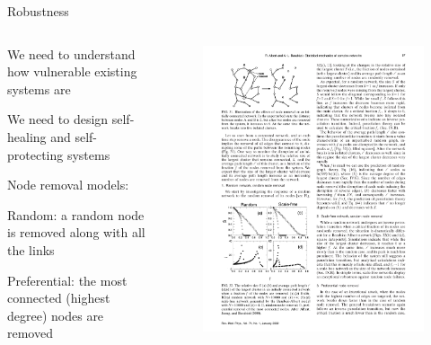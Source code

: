 \begin{frame}{Robustness}

\begin{columns}
\begin{column}{0.5\textwidth}
\BIL
\item We need to understand how vulnerable existing systems are
\item We need to design self-healing and self-protecting systems
\item Node removal models:
	\BI 
	\item \alert{Random}: a random node is removed along with all the links
	\item \alert{Preferential}: the most connected (highest degree) nodes are removed
	\EI
\EIL
\end{column}
\begin{column}{0.5\textwidth}

\begin{figure}
	\includegraphics[width=\textwidth]{figs/08/robustness1.pdf}
\end{figure}
\end{column}
\end{columns}

\end{frame}

